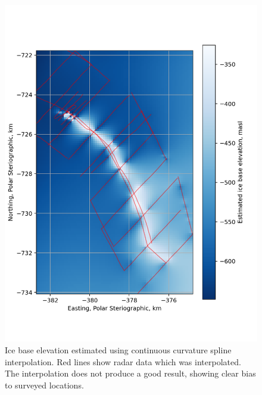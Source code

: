 \begin{figure}[h!]
\includegraphics[width=1\textwidth]{chapters/2/gmt_surface_interp.png}
\caption[]{Ice base elevation estimated using continuous curvature spline interpolation. Red lines show radar data which was interpolated. The interpolation does not produce a good result, showing clear bias to surveyed locations.}
\label{fig:gmt_surface_interp}
\end{figure}

